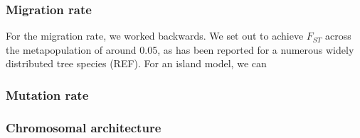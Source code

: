 \documentclass[11pt,twoside,lineno]{GSA_format}
\begin{document}
\subsubsection{Migration rate} 

For the migration rate, we worked backwards. We set out to achieve $F_{ST}$ across the metapopulation of around 0.05, as has been reported for a numerous widely distributed tree species (REF). For an island model, we can 

\subsubsection{Mutation rate} 

\subsubsection{Chromosomal architecture}

\pagebreak
\end{document}
